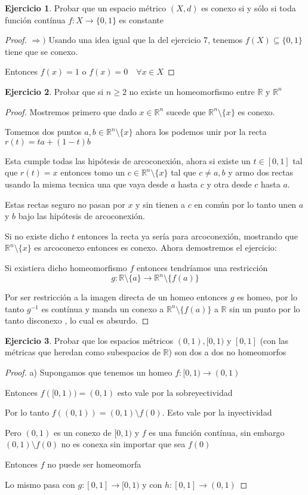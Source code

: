 \documentclass[11pt]{report}
\newcommand{\R}{\mathbb{R}}
\newcommand{\Ra}{\Rightarrow}
\newcommand{\ra}{\rightarrow}
\theoremstyle{definition}
\newtheorem{ej}{Ejercicio}
\begin{document}
\begin{ej}
	Probar que un espacio métrico $(X,d)$ es conexo si y sólo si toda función contínua $f: X \ra \{0,1\}$ es constante
	\begin{proof}
	$\Ra )$	Usando una idea igual que la del ejercicio 7, tenemos $f(X) \subseteq \{0,1\}$ tiene que se conexo.

	Entonces $f(x) = 1$ o $f(x) = 0 \quad \forall x \in X$ 

	\end{proof}
\end{ej}

\begin{ej}
	Probar que si $n \geq 2$ no existe un homeomorfismo entre $\R$ y $\R^n $
	\begin{proof}
		Mostremos primero que dado $x \in \R^n $ sucede que $\R^n \setminus \{x\}$ es conexo.

		Tomemos dos puntos $a,b \in \R^n \setminus \{x\}$ ahora los podemos unir por la recta $r(t) = ta + (1-t)b$

		Esta cumple todas las hipótesis de arcoconexión, ahora si existe un $t \in [0,1]$ tal que $r(t) = x$ entonces tomo un $c \in \R^n \setminus \{x\}$ tal que $c \neq a,b$ y armo dos rectas usando la misma tecnica una que vaya desde $a$ hasta $c$ y otra desde $c$ hasta $a$.

		Estas rectas seguro no pasan por $x$ y sin tienen a $c$ en común por lo tanto unen $a$ y $b$ bajo las hipótesis de arcoconexión.

		Si no existe dicho $t$ entonces la recta ya sería para arcoconexión, mostrando que $\R^n \setminus \{x\}$ es arcoconexo entonces es conexo.
		Ahora demostremos el ejercicio:

		Si existiera dicho homeomorfismo $f$ entonces tendríamos una restricción 
		$$g : \R \setminus \{a\} \ra \R^n \setminus \{f(a)\} $$ 

		Por ser restricción a la imagen directa de un homeo entonces $g$ es homeo, por lo tanto $g^{-1}$ es contínua y manda un conexo a $\R^n \setminus\{f(a)\}$ a $\R$ sin un punto por lo tanto disconexo , lo cual es absurdo.
		 
	\end{proof}
\end{ej}

\begin{ej}
	Probar que los espacios métricos $(0,1),[0,1)$ y $[0,1]$ (con las métricas que heredan como subespacios de $\R$) son dos a dos no homeomorfos
\begin{proof}
a) Supongamos que tenemos un homeo $f: [0,1) \ra (0,1)$ 

Entonces $f([0,1)) = (0,1)$ esto vale por la sobreyectividad

Por lo tanto $f( (0,1)) = (0,1) \setminus f(0)$. Esto vale por la inyectividad

Pero $(0,1)$ es un conexo de $[0,1)$ y $f$ es una función contínua, sin embargo $(0,1)\setminus f(0)$ no es conexa sin importar que sea $f(0)$

Entonces $f$ no puede ser homeomorfa

Lo mismo pasa con $g : [0,1] \ra [0,1)$ y con $h: [0,1] \ra (0,1)$
\end{proof}
\end{ej}
\end{document}
